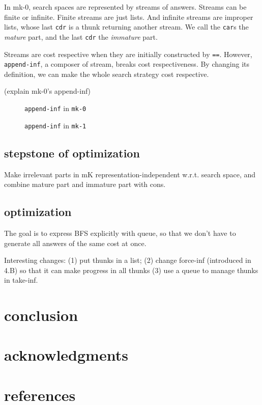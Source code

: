 \documentclass[format=acmlarge, review=true, authordraft=true]{acmart}
\begin{document}
In mk-0, search spaces are represented by streams of answers. Streams can be finite or infinite. Finite streams are just lists. And infinite streams are improper lists, whose last \texttt{cdr} is a thunk returning another stream. We call the \texttt{car}s the \emph{mature} part, and the last \texttt{cdr} the \emph{immature} part. 

Streams are cost respective when they are initially constructed by \texttt{==}. However, \texttt{append-inf}, a composer of stream, breaks cost respectiveness. By changing its definition, we can make the whole search strategy cost respective.

(explain mk-0's append-inf)

\begin{figure}
	 	
	 \caption{\texttt{append-inf} in \texttt{mk-0}}
	 \label{append-inf-0}
\end{figure}

\begin{figure}
	 	
	 \caption{\texttt{append-inf} in \texttt{mk-1}}
	 \label{append-inf-1}
\end{figure}



\subsection{stepstone of optimization}

Make irrelevant parts in mK representation-independent w.r.t. search space, and combine mature part and immature part with cons.

\subsection{optimization}

The goal is to express BFS explicitly with queue, so that we don’t have to generate all answers of the same cost at once.

Interesting changes: (1) put thunks in a list; (2) change force-inf (introduced in 4.B) so that it can make progress in all thunks (3) use a queue to manage thunks in take-inf.

\section{conclusion}

\section*{acknowledgments}

\section*{references}
\end{document}
